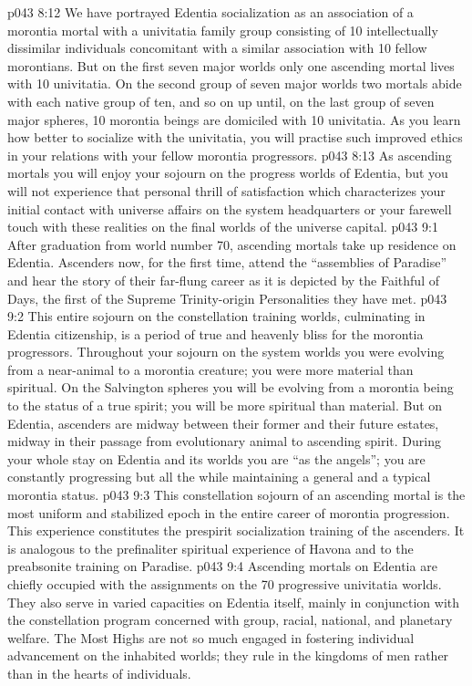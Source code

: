 \vs p043 8:12 \pc We have portrayed Edentia socialization as an association of a morontia mortal with a univitatia family group consisting of 10 intellectually dissimilar individuals concomitant with a similar association with 10 fellow morontians. But on the first seven major worlds only one ascending mortal lives with 10 univitatia. On the second group of seven major worlds two mortals abide with each native group of ten, and so on up until, on the last group of seven major spheres, 10 morontia beings are domiciled with 10 univitatia. As you learn how better to socialize with the univitatia, you will practise such improved ethics in your relations with your fellow morontia progressors.
\vs p043 8:13 As ascending mortals you will enjoy your sojourn on the progress worlds of Edentia, but you will not experience that personal thrill of satisfaction which characterizes your initial contact with universe affairs on the system headquarters or your farewell touch with these realities on the final worlds of the universe capital.
\vs p043 9:1 After graduation from world number 70, ascending mortals take up residence on Edentia. Ascenders now, for the first time, attend the “assemblies of Paradise” and hear the story of their far\hyp{}flung career as it is depicted by the Faithful of Days, the first of the Supreme Trinity\hyp{}origin Personalities they have met.
\vs p043 9:2 \pc This entire sojourn on the constellation training worlds, culminating in Edentia citizenship, is a period of true and heavenly bliss for the morontia progressors. Throughout your sojourn on the system worlds you were evolving from a near\hyp{}animal to a morontia creature; you were more material than spiritual. On the Salvington spheres you will be evolving from a morontia being to the status of a true spirit; you will be more spiritual than material. But on Edentia, ascenders are midway between their former and their future estates, midway in their passage from evolutionary animal to ascending spirit. During your whole stay on Edentia and its worlds you are “as the angels”; you are constantly progressing but all the while maintaining a general and a typical morontia status.
\vs p043 9:3 This constellation sojourn of an ascending mortal is the most uniform and stabilized epoch in the entire career of morontia progression. This experience constitutes the prespirit socialization training of the ascenders. It is analogous to the prefinaliter spiritual experience of Havona and to the preabsonite training on Paradise.
\vs p043 9:4 \pc Ascending mortals on Edentia are chiefly occupied with the assignments on the 70 progressive univitatia worlds. They also serve in varied capacities on Edentia itself, mainly in conjunction with the constellation program concerned with group, racial, national, and planetary welfare. The Most Highs are not so much engaged in fostering individual advancement on the inhabited worlds; they rule in the kingdoms of men rather than in the hearts of individuals.
